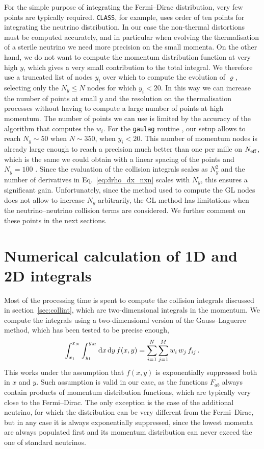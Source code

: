 \documentclass[notitlepage,showpacs,preprintnumbers,amsmath,amssymb,superscriptaddress,prd,onecolumn]{revtex4-1}
\newcommand{\Neff}{\ensuremath{N_{\rm eff}}}
\begin{document}
For the simple purpose of integrating the Fermi--Dirac distribution, very few points are typically required.
\texttt{CLASS}, for example, uses order of ten points for integrating the neutrino distribution.
In our case the non-thermal distortions must be computed accurately, and in particular
when evolving the thermalisation of a sterile neutrino we need more precision on the small momenta.
On the other hand, we do not want to compute the momentum distribution function at very high $y$,
which gives a very small contribution to the total integral. We therefore use a truncated list of nodes $y_i$ over which to compute the evolution of $\varrho$,
selecting only the $N_y\leq N$ nodes for which $y_i<20$.
In this way we can increase the number of points at small $y$ and the resolution on the thermalisation processes
without having to compute a large number of points at high momentum.
The number of points we can use is limited by the accuracy of the algorithm that computes the $w_i$.
For the \texttt{gaulag} routine \cite{NR}, our setup allows to reach $N_y\sim50$ when $N\sim350$,
when $y_i<20$.
This number of momentum nodes is already large enough to reach a precision
much better than one per mille on \Neff, which is the same we could obtain with a linear spacing of the points
and $N_y=100$ \cite{deSalas:2016ztq}.
Since the evaluation of the collision integrals scales as $N_y^2$
and the number of derivatives in Eq.~\eqref{eq:drho_dx_nxn} scales with $N_y$,
this ensures a significant gain.
Unfortunately, since the method used to compute the GL nodes does not allow to increase $N_y$ arbitrarily,
the GL method has limitations when the neutrino--neutrino collision terms are considered.
We further comment on these points in the next sections.


\section{Numerical calculation of 1D and 2D integrals}
\label{ssec:integrals}
Most of the processing time is spent to compute the collision integrals
discussed in section~\ref{sec:collint}, which are two-dimensional integrals in the momentum.
We compute the integrals using a two-dimensional version of the Gauss--Laguerre method,
which has been tested to be precise enough,
%
\begin{equation}
\int_{x_1}^{x_N}\int_{y_1}^{y_M}{\rm d}x\, \mathrm{d}y\, f(x, y)
=
\sum_{i=1}^{N}\sum_{j=1}^{M}
w_i\,w_j\,f_{ij}
\,.
\end{equation}
This works under the assumption that $f(x,y)$ is exponentially suppressed both in $x$ and $y$.
Such assumption is valid in our case, as the functions $F_{ab}$ always contain products of momentum distribution functions,
which are typically very close to the Fermi--Dirac.
The only exception is the case of the additional neutrino, for which the distribution can be very different from the Fermi--Dirac,
but in any case it is always exponentially suppressed, since the lowest momenta
are always populated first and its momentum distribution can never exceed the one of standard neutrinos.
\end{document}
